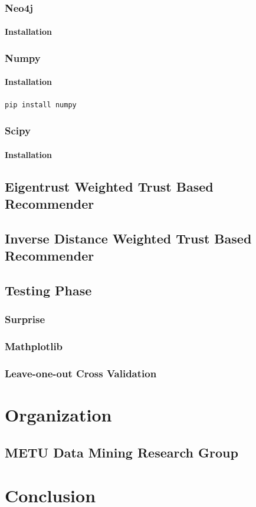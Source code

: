 \documentclass[12pt]{article}
\begin{document}
\subsubsection{Neo4j}
\paragraph{Installation}
\subsubsection{Numpy}
\paragraph{Installation}

\begin{lstlisting}[language=bash]
pip install numpy
\end{lstlisting}


\subsubsection{Scipy}
\paragraph{Installation}

\subsection{Eigentrust Weighted Trust Based Recommender}
\subsection{Inverse Distance Weighted Trust Based Recommender}
\subsection{Testing Phase}
\subsubsection{Surprise}
\subsubsection{Mathplotlib}
\subsubsection{Leave-one-out Cross Validation}

\section{Organization}
\subsection{METU Data Mining Research Group}

\section{Conclusion}



\end{document}
